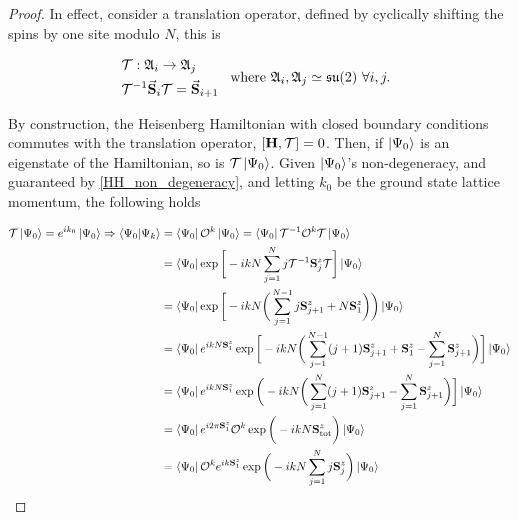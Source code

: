 \documentclass{homework}
\begin{document}
\begin{proof}
In effect, consider a translation operator, defined by cyclically shifting the spins by one site modulo $N$, this is 

\begin{equation}
\begin{split}
    &\mathcal{T} : \mathfrak{A}_i \rightarrow \mathfrak{A}_j \\
    &\mathcal{T}^{-1} \vec{\bf S}_i \mathcal{T} = \vec{{\bf S}}_{i+1}
\end{split}
\begin{array}{c}
     \textnormal{ where } \mathfrak{A}_i, \mathfrak{A}_j \simeq \mathfrak{su}(2) \textnormal{ } \forall i,j. 
\end{array}
\end{equation}

By construction, the Heisenberg Hamiltonian with closed boundary conditions commutes with the translation operator, $[{\bf H}, \mathcal{T}] = 0$.
Then, if $\ket{\Psi_0}$ is an eigenstate of the Hamiltonian, so is $\mathcal{T} \ket{\Psi_0}$. Given $\ket{\Psi_0}$'s non-degeneracy, and guaranteed by \cref{HH_non_degeneracy}, and letting $k_0$ be the ground state lattice momentum, the following holds

\begin{equation}
\begin{split}
    \mathcal{T} \ket{\Psi_0} = e^{i k_0} \ket{\Psi_0} 
    \Rightarrow \bra{\Psi_0} \ket{\Psi_k} &= \bra{\Psi_0} \mathcal{O}^{k}\ket{\Psi_0} =  \bra{\Psi_0} \mathcal{T}^{-1} \mathcal{O}^{k} \mathcal{T} \ket{\Psi_0} \\
    &= \bra{\Psi_0} \exp \bigg[-ikN \sum_{j=1}^{N} j \mathcal{T}^{-1} {\bf S}_j^z \mathcal{T} \bigg] \ket{\Psi_0} \\
    &= \bra{\Psi_0} \exp \bigg[-ikN \bigg( \sum_{j=1}^{N-1} j {\bf S}_{j+1}^z + N {\bf S}_1^z \bigg)\bigg) \ket{\Psi_0} \\
    &= \bra{\Psi_0} e^{i k N  {\bf S}_1^z}\exp \bigg[-ikN \bigg( \sum_{j=1}^{N-1} (j+1) {\bf S}_{j+1}^z + {\bf S}_{1}^z - \sum_{j=1}^{N}  {\bf S}_{j+1}^z  \bigg)\bigg] \ket{\Psi_0} \\
    &= \bra{\Psi_0} e^{i k N {\bf S}_1^z} \exp \bigg(-ikN \bigg( \sum_{j=1}^{N} (j+1) {\bf S}_{j+1}^z - \sum_{j=1}^{N}  {\bf S}_{j+1}^z  \bigg)\bigg] \ket{\Psi_0} \\
    &= \bra{\Psi_0} e^{i 2 \pi {\bf S}_1^z} \mathcal{O}^k  \exp \bigg(- i k N {\bf S}_{\textnormal{tot}}^z\bigg) \ket{\Psi_0} \\
    &= \bra{\Psi_0} \mathcal{O}^{k} e^{ik {\bf S}_1^z} \exp \bigg(-ikN \sum_{j=1}^{N} j {\bf S}_j^z \bigg) \ket{\Psi_0} \\
\end{split}
\end{equation}


\end{proof}
\end{document}

